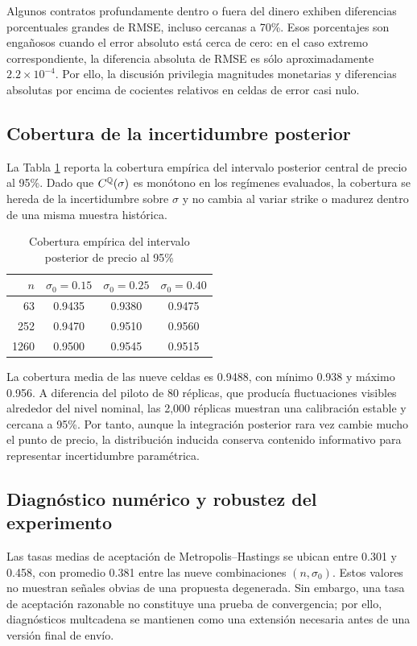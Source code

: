 Algunos contratos profundamente dentro o fuera del dinero exhiben diferencias porcentuales grandes de RMSE, incluso cercanas a 70\%. Esos porcentajes son engañosos cuando el error absoluto está cerca de cero: en el caso extremo correspondiente, la diferencia absoluta de RMSE es sólo aproximadamente $2.2\times10^{-4}$. Por ello, la discusión privilegia magnitudes monetarias y diferencias absolutas por encima de cocientes relativos en celdas de error casi nulo.

\subsection{Cobertura de la incertidumbre posterior}

La Tabla \ref{tab:coverage} reporta la cobertura empírica del intervalo posterior central de precio al 95\%. Dado que $C^{\mathbb{Q}}(\sigma)$ es monótono en los regímenes evaluados, la cobertura se hereda de la incertidumbre sobre $\sigma$ y no cambia al variar strike o madurez dentro de una misma muestra histórica.

\begin{table}[H]
\centering
\caption{Cobertura empírica del intervalo posterior de precio al 95\%}
\label{tab:coverage}
\begin{tabular}{rccc}
\toprule
$n$ & $\sigma_0=0.15$ & $\sigma_0=0.25$ & $\sigma_0=0.40$ \\
\midrule
63   & 0.9435 & 0.9380 & 0.9475 \\
252  & 0.9470 & 0.9510 & 0.9560 \\
1260 & 0.9500 & 0.9545 & 0.9515 \\
\bottomrule
\end{tabular}
\end{table}

La cobertura media de las nueve celdas es 0.9488, con mínimo 0.938 y máximo 0.956. A diferencia del piloto de 80 réplicas, que producía fluctuaciones visibles alrededor del nivel nominal, las 2,000 réplicas muestran una calibración estable y cercana a 95\%. Por tanto, aunque la integración posterior rara vez cambie mucho el punto de precio, la distribución inducida conserva contenido informativo para representar incertidumbre paramétrica.

\subsection{Diagnóstico numérico y robustez del experimento}

Las tasas medias de aceptación de Metropolis--Hastings se ubican entre 0.301 y 0.458, con promedio 0.381 entre las nueve combinaciones $(n,\sigma_0)$. Estos valores no muestran señales obvias de una propuesta degenerada. Sin embargo, una tasa de aceptación razonable no constituye una prueba de convergencia; por ello, diagnósticos multcadena se mantienen como una extensión necesaria antes de una versión final de envío.

